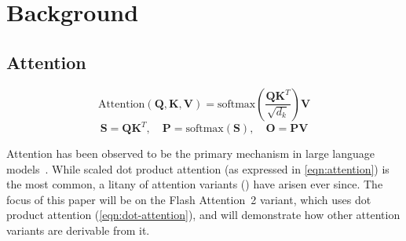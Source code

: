 \documentclass[review, anonymous, acmsmall]{acmart}
\begin{document}
\section{Background}

%
%
%

\subsection{Attention}


\begin{equation}
  \label{eqn:attention}
  \text{Attention}(\mathbf{Q}, \mathbf{K}, \mathbf{V}) = \text{softmax}(\frac{\mathbf{Q} \mathbf{K}^T}{\sqrt{d_k}}) \mathbf{V}
\end{equation}
\begin{equation}
  \label{eqn:dot-attention}
  \mathbf{S} = \mathbf{Q} \mathbf{K}^T, \quad \mathbf{P} = \text{softmax}(\mathbf{S}), \quad \mathbf{O} = \mathbf{P} \mathbf{V}
\end{equation}

Attention has been observed to be the primary mechanism in large language models~\cite{vaswani_attention_2023}. While scaled dot product attention (as expressed in \autoref{eqn:attention}) is the most common, a litany of attention variants (\cite{dao_flashattention_2022, dao_flashattention-2_2023}) have arisen ever since. The focus of this paper will be on the Flash Attention~2 \cite{dao_flashattention-2_2023} variant, which uses dot product attention (\autoref{eqn:dot-attention}), and will demonstrate how other attention variants are derivable from it.
\end{document}
